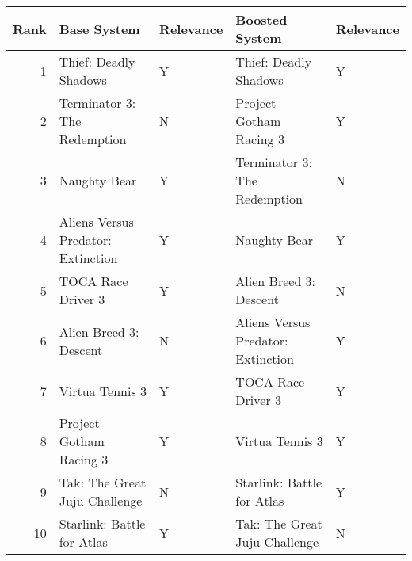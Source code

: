 \begin{tabular}{rllll}
\toprule
Rank & Base System & Relevance & Boosted System & Relevance \\
\midrule
1 & Thief: Deadly Shadows & Y & Thief: Deadly Shadows & Y \\
2 & Terminator 3: The Redemption & N & Project Gotham Racing 3 & Y \\
3 & Naughty Bear & Y & Terminator 3: The Redemption & N \\
4 & Aliens Versus Predator: Extinction & Y & Naughty Bear & Y \\
5 & TOCA Race Driver 3 & Y & Alien Breed 3: Descent & N \\
6 & Alien Breed 3: Descent & N & Aliens Versus Predator: Extinction & Y \\
7 & Virtua Tennis 3 & Y & TOCA Race Driver 3 & Y \\
8 & Project Gotham Racing 3 & Y & Virtua Tennis 3 & Y \\
9 & Tak: The Great Juju Challenge & N & Starlink: Battle for Atlas & Y \\
10 & Starlink: Battle for Atlas & Y & Tak: The Great Juju Challenge & N \\
\bottomrule
\end{tabular}
